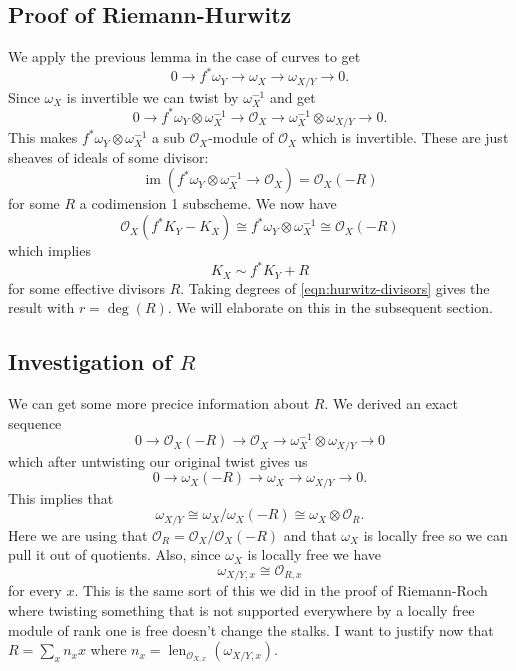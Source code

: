 \documentclass[12pt]{article}
\numberwithin{equation}{section}
\theoremstyle{definition}
\theoremstyle{remark}
\newcommand{\Ocal}{\mathcal{O}}
\newcommand{\im}{\operatorname{im}}
\newcommand{\len}{\operatorname{len}}
\begin{document}
\subsection{Proof of Riemann-Hurwitz}

We apply the previous lemma in the case of curves to get 
 $$ 0 \to f^*\omega_Y \to \omega_X \to \omega_{X/Y} \to 0.$$
Since $\omega_X$ is invertible we can twist by $\omega_X^{-1}$ and get 
 $$ 0 \to f^*\omega_Y \otimes \omega_X^{-1} \to \Ocal_X \to \omega_X^{-1} \otimes \omega_{X/Y} \to 0 . $$
This makes $f^*\omega_Y\otimes \omega_X^{-1}$ a sub $\Ocal_X$-module of $\Ocal_X$ which is invertible. 
These are just sheaves of ideals of some divisor:
 $$ \im( f^*\omega_Y\otimes \omega_X^{-1} \to \Ocal_X) = \Ocal_X(-R) $$
for some $R$ a codimension 1 subscheme.
We now have
 $$ \Ocal_X(f^*K_Y-K_X) \cong f^*\omega_Y \otimes \omega_X^{-1} \cong \Ocal_X(-R) $$
which implies 
\begin{equation}\label{eqn:hurwitz-divisors}
K_X\sim f^*K_Y + R
\end{equation}
for some effective divisors $R$.
Taking degrees of \eqref{eqn:hurwitz-divisors} gives the result with $r =\deg(R)$.
We will elaborate on this in the subsequent section.

\subsection{Investigation of $R$}
We can get some more precice information about $R$. 
We derived an exact sequence 
 $$ 0 \to \Ocal_X(-R) \to \Ocal_X \to \omega_X^{-1} \otimes \omega_{X/Y} \to 0 $$
which after untwisting our original twist gives us 
$$0 \to \omega_X(-R) \to \omega_X \to \omega_{X/Y} \to 0. $$
This implies that 
 $$\omega_{X/Y} \cong \omega_X/\omega_X(-R) \cong \omega_X \otimes \Ocal_R.$$
Here we are using that $\Ocal_R = \Ocal_X/\Ocal_X(-R)$ and that $\omega_X$ is locally free so we can pull it out of quotients.
Also, since $\omega_X$ is locally free we have 
 $$ \omega_{X/Y,x} \cong \Ocal_{R,x} $$
for every $x$. 
This is the same sort of this we did in the proof of Riemann-Roch where twisting something that is not supported everywhere by a locally free module of rank one is free doesn't change the stalks. I want to justify now that $R=\sum_x n_x x$ where $n_x = \len_{\Ocal_{X,x}}(\omega_{X/Y,x})$.
\end{document}
